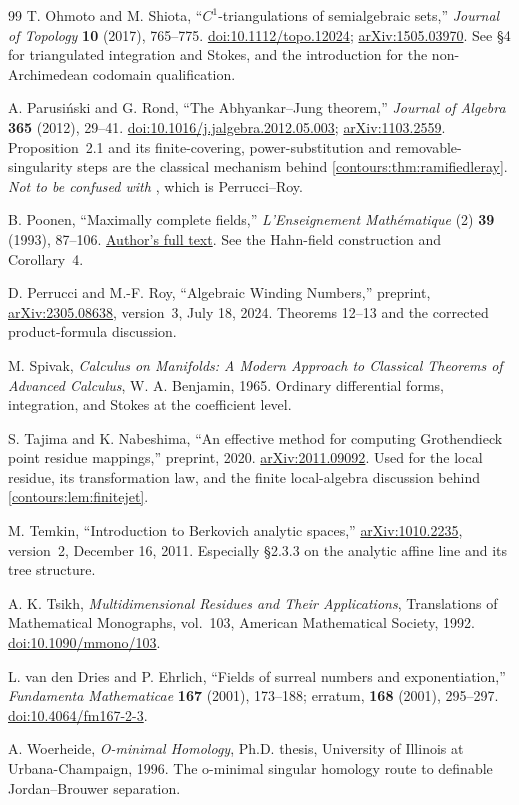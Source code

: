 \documentclass[11pt,letterpaper]{article}
\theoremstyle{definition}
\theoremstyle{remark}
\numberwithin{equation}{section}
\begin{document}
\begin{thebibliography}{99}
T. Ohmoto and M. Shiota, ``$C^1$-triangulations of semialgebraic sets,''
\emph{Journal of Topology} \textbf{10} (2017), 765--775.
\href{https://doi.org/10.1112/topo.12024}{doi:10.1112/topo.12024};
\href{https://arxiv.org/abs/1505.03970}{arXiv:1505.03970}. See \S4 for triangulated
integration and Stokes, and the introduction for the non-Archimedean codomain
qualification.

A. Parusi\'nski and G. Rond, ``The Abhyankar--Jung theorem,'' \emph{Journal of
Algebra} \textbf{365} (2012), 29--41.
\href{https://doi.org/10.1016/j.jalgebra.2012.05.003}{doi:10.1016/j.jalgebra.2012.05.003};
\href{https://arxiv.org/abs/1103.2559}{arXiv:1103.2559}. Proposition~2.1 and its
finite-covering, power-substitution and removable-singularity steps are the
classical mechanism behind \cref{contours:thm:ramifiedleray}. \emph{Not to be
confused with \cite{PR}}, which is Perrucci--Roy.

B. Poonen, ``Maximally complete fields,'' \emph{L'Enseignement Math\'ematique} (2)
\textbf{39} (1993), 87--106.
\href{https://math.mit.edu/~poonen/papers/amsval.pdf}{Author's full text}. See the
Hahn-field construction and Corollary~4.

D. Perrucci and M.-F. Roy, ``Algebraic Winding Numbers,'' preprint,
\href{https://arxiv.org/abs/2305.08638}{arXiv:2305.08638}, version~3, July 18, 2024.
Theorems 12--13 and the corrected product-formula discussion.

M. Spivak, \emph{Calculus on Manifolds: A Modern Approach to Classical Theorems of
Advanced Calculus}, W. A. Benjamin, 1965. Ordinary differential forms, integration,
and Stokes at the coefficient level.

S. Tajima and K. Nabeshima, ``An effective method for computing Grothendieck
point residue mappings,'' preprint, 2020.
\href{https://arxiv.org/abs/2011.09092}{arXiv:2011.09092}. Used for the local
residue, its transformation law, and the finite local-algebra discussion behind
\cref{contours:lem:finitejet}.

M. Temkin, ``Introduction to Berkovich analytic spaces,''
\href{https://arxiv.org/abs/1010.2235}{arXiv:1010.2235}, version~2, December 16, 2011.
Especially \S2.3.3 on the analytic affine line and its tree structure.

A. K. Tsikh, \emph{Multidimensional Residues and Their Applications}, Translations of
Mathematical Monographs, vol.~103, American Mathematical Society, 1992.
\href{https://doi.org/10.1090/mmono/103}{doi:10.1090/mmono/103}.

L. van den Dries and P. Ehrlich, ``Fields of surreal numbers and exponentiation,''
\emph{Fundamenta Mathematicae} \textbf{167} (2001), 173--188; erratum, \textbf{168}
(2001), 295--297.
\href{https://doi.org/10.4064/fm167-2-3}{doi:10.4064/fm167-2-3}.

A. Woerheide, \emph{O-minimal Homology}, Ph.D. thesis, University of Illinois at
Urbana-Champaign, 1996. The o-minimal singular homology route to definable
Jordan--Brouwer separation.

\end{thebibliography}
\end{document}
